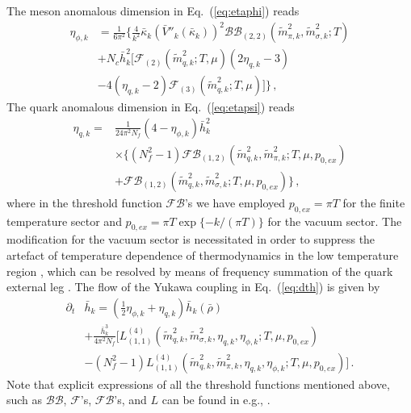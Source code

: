 \documentclass[%
reprint,
superscriptaddress,
showpacs,preprintnumbers,
 amsmath,amssymb,
 aps,
prd,
]{revtex4-1}
\def\Eq#1{Eq.~(\ref{#1})}
\begin{document}
The meson anomalous dimension in \Eq{eq:etaphi} reads
%
\begin{align}
  \eta_{\phi,k}&=\frac{1}{6\pi^2}\Bigg\{\frac{4}{k^2} \bar{\kappa}_k(\bar{V}''_k(\bar{\kappa}_k))^2\mathcal{BB}_{(2,2)}(\tilde{m}^{2}_{\pi,k},\tilde{m}^{2}_{\sigma,k};T)\nonumber\\[2ex]
&+N_c\bar{h}^{2}_{k}\bigg[\mathcal{F}_{(2)}(\tilde{m}^{2}_{q,k};T,\mu)(2\eta_{q,k}-3)\nonumber\\[2ex]
&-4(\eta_{q,k}-2)\mathcal{F}_{(3)}(\tilde{m}^2_{q,k};T,\mu)\bigg]\Bigg\}\,, \label{eq:etaphi2}  
\end{align} 
%
The quark anomalous dimension in \Eq{eq:etapsi} reads
\begin{align}
\eta_{q,k}=&\frac{1}{24\pi^2N_f}(4-\eta_{\phi,k})\bar{h}^{2}_{k}\nonumber\\[2ex]
&\times\bigg\{ (N^{2}_{f}-1)\mathcal{FB}_{(1,2)}(\tilde{m}^{2}_{q,k},\tilde{m}^{2}_{\pi,k};T,\mu,p_{0,ex})\nonumber\\[2ex]
&+\mathcal{FB}_{(1,2)}(\tilde{m}^{2}_{q,k},\tilde{m}^{2}_{\sigma,k};T,\mu,p_{0,ex})\bigg\}\,, \label{eq:etapsi2}
\end{align} 
where in the threshold function $\mathcal{FB}$'s we have employed $p_{0,ex}=\pi T$ for the finite temperature sector and $p_{0,ex}=\pi T\exp\{-k/(\pi T)\}$ for the vacuum sector. The modification for the vacuum sector is necessitated in order to suppress the artefact of temperature dependence of thermodynamics in the low temperature region \cite{Fu:2015naa}, which can be resolved by means of frequency summation of the quark external leg \cite{Fu:2016tey}. The flow of the Yukawa coupling in \Eq{eq:dth} is given by
\begin{align}
  \partial_t&\bar{h}_k=\left(\frac{1}{2}\eta_{\phi,k}+\eta_{q,k}\right)\bar{h}_k(\bar{\rho})\nonumber\\[2ex]
&+\frac{\bar{h}^3_k}{4\pi^2N_f}\bigg[L^{(4)}_{(1,1)}(\tilde{m}^{2}_{q,k},\tilde{m}^{2}_{\sigma,k},\eta_{q,k},\eta_{\phi,k};T,\mu,p_{0,ex})\nonumber\\[2ex]
&-(N^{2}_{f}-1)L^{(4)}_{(1,1)}(\tilde{m}^{2}_{q,k},\tilde{m}^{2}_{\pi,k},\eta_{q,k},\eta_{\phi,k};T,\mu,p_{0,ex})\bigg]\,.\label{eq:dth2}  
\end{align} 
Note that explicit expressions of all the threshold functions mentioned above, such as $\mathcal{BB}$, $\mathcal{F}$'s, $\mathcal{FB}$'s, and $L$ can be found in e.g., \cite{Fu:2019hdw,Yin:2019ebz}.
\end{document}
